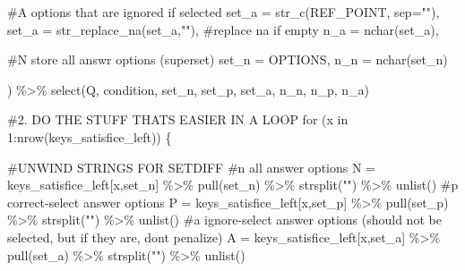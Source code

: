 \documentclass[
  letterpaper,
  DIV=11,
  numbers=noendperiod]{scrreprt}
\newenvironment{Shaded}{\begin{snugshade}}{\end{snugshade}}
\newcommand{\AttributeTok}[1]{\textcolor[rgb]{0.40,0.45,0.13}{#1}}
\newcommand{\CommentTok}[1]{\textcolor[rgb]{0.37,0.37,0.37}{#1}}
\newcommand{\ControlFlowTok}[1]{\textcolor[rgb]{0.00,0.23,0.31}{#1}}
\newcommand{\DecValTok}[1]{\textcolor[rgb]{0.68,0.00,0.00}{#1}}
\newcommand{\FunctionTok}[1]{\textcolor[rgb]{0.28,0.35,0.67}{#1}}
\newcommand{\NormalTok}[1]{\textcolor[rgb]{0.00,0.23,0.31}{#1}}
\newcommand{\OtherTok}[1]{\textcolor[rgb]{0.00,0.23,0.31}{#1}}
\newcommand{\SpecialCharTok}[1]{\textcolor[rgb]{0.37,0.37,0.37}{#1}}
\newcommand{\StringTok}[1]{\textcolor[rgb]{0.13,0.47,0.30}{#1}}
\begin{document}
\begin{Shaded}
\begin{Highlighting}[]
    \CommentTok{\#A options that are ignored if selected }
    \AttributeTok{set\_a =} \FunctionTok{str\_c}\NormalTok{(REF\_POINT, }\AttributeTok{sep=}\StringTok{""}\NormalTok{),}
    \AttributeTok{set\_a =} \FunctionTok{str\_replace\_na}\NormalTok{(set\_a,}\StringTok{""}\NormalTok{), }\CommentTok{\#replace na if empty}
    \AttributeTok{n\_a =} \FunctionTok{nchar}\NormalTok{(set\_a),}
    
    \CommentTok{\#N store all answr options (superset)}
    \AttributeTok{set\_n =}\NormalTok{ OPTIONS,  }
    \AttributeTok{n\_n =} \FunctionTok{nchar}\NormalTok{(set\_n)}
  
\NormalTok{) }\SpecialCharTok{\%\textgreater{}\%} \FunctionTok{select}\NormalTok{(Q, condition, set\_n, set\_p, set\_a, n\_n, n\_p, n\_a)}

\CommentTok{\#2. DO THE STUFF THAT\textquotesingle{}S EASIER IN A LOOP}
\ControlFlowTok{for}\NormalTok{ (x }\ControlFlowTok{in} \DecValTok{1}\SpecialCharTok{:}\FunctionTok{nrow}\NormalTok{(keys\_satisfice\_left)) \{}
  
  \CommentTok{\#UNWIND STRINGS FOR SETDIFF}
  \CommentTok{\#n all answer options}
\NormalTok{  N }\OtherTok{=}\NormalTok{ keys\_satisfice\_left[x,}\StringTok{\textquotesingle{}set\_n\textquotesingle{}}\NormalTok{] }\SpecialCharTok{\%\textgreater{}\%} \FunctionTok{pull}\NormalTok{(set\_n) }\SpecialCharTok{\%\textgreater{}\%} \FunctionTok{strsplit}\NormalTok{(}\StringTok{""}\NormalTok{) }\SpecialCharTok{\%\textgreater{}\%} \FunctionTok{unlist}\NormalTok{()}
  \CommentTok{\#p correct{-}select answer options}
\NormalTok{  P }\OtherTok{=}\NormalTok{ keys\_satisfice\_left[x,}\StringTok{\textquotesingle{}set\_p\textquotesingle{}}\NormalTok{] }\SpecialCharTok{\%\textgreater{}\%} \FunctionTok{pull}\NormalTok{(set\_p) }\SpecialCharTok{\%\textgreater{}\%} \FunctionTok{strsplit}\NormalTok{(}\StringTok{""}\NormalTok{) }\SpecialCharTok{\%\textgreater{}\%} \FunctionTok{unlist}\NormalTok{()}
  \CommentTok{\#a ignore{-}select answer options (should not be selected, but if they are, don\textquotesingle{}t penalize)}
\NormalTok{  A }\OtherTok{=}\NormalTok{ keys\_satisfice\_left[x,}\StringTok{\textquotesingle{}set\_a\textquotesingle{}}\NormalTok{] }\SpecialCharTok{\%\textgreater{}\%} \FunctionTok{pull}\NormalTok{(set\_a) }\SpecialCharTok{\%\textgreater{}\%} \FunctionTok{strsplit}\NormalTok{(}\StringTok{""}\NormalTok{) }\SpecialCharTok{\%\textgreater{}\%} \FunctionTok{unlist}\NormalTok{() }
  

\end{Highlighting}
\end{Shaded}
\end{document}
